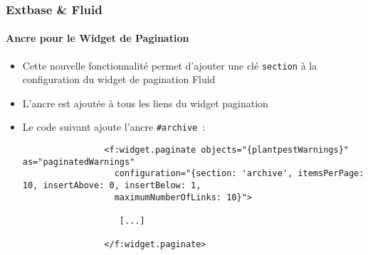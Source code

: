 \begin{frame}[fragile]
	\frametitle{Extbase \& Fluid}
	\framesubtitle{Ancre pour le Widget de Pagination}

	\lstset{basicstyle=\tiny\ttfamily}

	\begin{itemize}

		\item Cette nouvelle fonctionnalité permet d'ajouter une clé \texttt{section} à la configuration
			du widget de pagination Fluid

		\item L'ancre est ajoutée à tous les liens du widget pagination

		\item Le code suivant ajoute l'ancre \texttt{\#archive}~:

			\begin{lstlisting}
				<f:widget.paginate objects="{plantpestWarnings}" as="paginatedWarnings"
				  configuration="{section: 'archive', itemsPerPage: 10, insertAbove: 0, insertBelow: 1,
				  maximumNumberOfLinks: 10}">

				   [...]

				</f:widget.paginate>
			\end{lstlisting}

	\end{itemize}

\end{frame}


